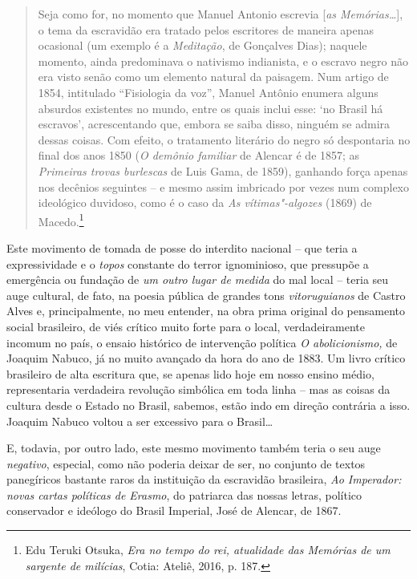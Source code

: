 \begin{quote}
Seja como for, no momento que Manuel Antonio escrevia {[}\emph{as
Memórias\ldots{}}{]}, o tema da escravidão era tratado pelos escritores de
maneira apenas ocasional (um exemplo é a \emph{Meditação}, de Gonçalves
Dias); naquele momento, ainda predominava o nativismo indianista, e o
escravo negro não era visto senão como um elemento natural da paisagem.
Num artigo de 1854, intitulado ``Fisiologia da voz'', Manuel Antônio
enumera alguns absurdos existentes no mundo, entre os quais inclui esse:
`no Brasil há escravos', acrescentando que, embora se saiba disso,
ninguém se admira dessas coisas. Com efeito, o tratamento literário do
negro só despontaria no final dos anos 1850 (\emph{O demônio familiar}
de Alencar é de 1857; as \emph{Primeiras trovas burlescas} de Luis Gama,
de 1859), ganhando força apenas nos decênios seguintes -- e mesmo assim
imbricado por vezes num complexo ideológico duvidoso, como é o caso da
\emph{As vítimas"-algozes} (1869) de Macedo.\footnote{Edu Teruki
  Otsuka, \emph{Era no tempo do rei, atualidade das \emph{Memórias de um
    sargente de milícias}}, Cotia: Ateliê, 2016, p. 187.}
\end{quote}

Este movimento de tomada de posse do interdito nacional -- que teria a
expressividade e o \emph{topos} constante do terror ignominioso, que
pressupõe a emergência ou fundação de \emph{um outro lugar de medida} do
mal local -- teria seu auge cultural, de fato, na poesia pública de
grandes tons \emph{vitoruguianos} de Castro Alves e, principalmente, no
meu entender, na obra prima original do pensamento social brasileiro, de
viés crítico muito forte para o local, verdadeiramente incomum no país,
o ensaio histórico de intervenção política \emph{O abolicionismo,} de
Joaquim Nabuco, já no muito avançado da hora do ano de 1883. Um livro
crítico brasileiro de alta escritura que, se apenas lido hoje em nosso
ensino médio, representaria verdadeira revolução simbólica em toda linha
-- mas as coisas da cultura desde o Estado no Brasil, sabemos, estão
indo em direção contrária a isso. Joaquim Nabuco voltou a ser excessivo
para o Brasil\ldots{}

E, todavia, por outro lado, este mesmo movimento também teria o seu auge
\emph{negativo}, especial, como não poderia deixar de ser, no conjunto
de textos panegíricos bastante raros da instituição da escravidão
brasileira, \emph{Ao Imperador: novas cartas políticas de Erasmo}, do
patriarca das nossas letras, político conservador e ideólogo do Brasil
Imperial, José de Alencar, de 1867.


